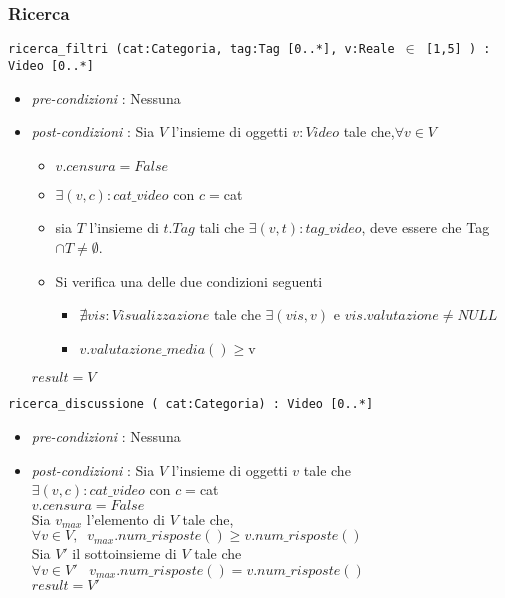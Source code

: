 \documentclass[12pt, letterpaper]{article}
\newcommand{\code}[1]{\colorbox{light-gray}{\texttt{#1}}}
\newcommand{\id}{{\hphantom{ident}}}
\begin{document}
\subsubsection{Ricerca}
\code{ricerca\_filtri (cat:Categoria, tag:Tag [0..*], v:Reale $\in$ [1,5] ) : Video [0..*]}\begin{itemize}
    \item\textit{pre-condizioni} : Nessuna
    \item \textit{post-condizioni} : Sia $V$ l'insieme di oggetti $v:Video$ tale che,$\forall v\in V$\begin{itemize}
              \item $v.censura=False$
              \item $\exists (v,c):cat\_video$ con $c=$cat
              \item sia $T$ l'insieme di $t.Tag$ tali che $\exists (v,t):tag\_video$, deve essere che Tag$\cap T\ne \emptyset$.
              \item Si verifica una delle due condizioni seguenti\begin{itemize}
                        \item $\nexists vis:Visualizzazione$ tale che $\exists(vis,v)$ e $vis.valutazione\ne NULL$
                        \item $v.valutazione\_media()\ge $v
                    \end{itemize}
          \end{itemize}
          $result=V$
\end{itemize}
\code{ricerca\_discussione ( cat:Categoria) : Video [0..*]}\begin{itemize}
    \item \textit{pre-condizioni} : Nessuna
    \item \textit{post-condizioni} : Sia $V$ l'insieme di oggetti $v$ tale che\\
          \id  $\exists (v,c):cat\_video$ con $c=$cat \\
          \id $v.censura=False$\\
          Sia $v_{max}$ l'elemento di $V$ tale che, $\forall v\in V,\;\;v_{max}.num\_risposte()\ge v.num\_risposte()$\\
          Sia $V'$ il sottoinsieme di $V$ tale che $\forall v\in V'\;\;\;v_{max}.num\_risposte()= v.num\_risposte()$\\
          $result=V'$
\end{itemize}
\end{document}
